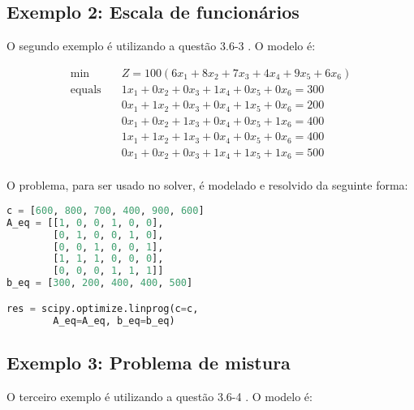 \documentclass[conference,compsoc]{IEEEtran}
\begin{document}
\subsection{Exemplo 2: Escala de funcionários} \label{sec_ex2}

O segundo exemplo é utilizando a questão 3.6-3 \cite{livro}. O modelo é:

\begin{equation}
\begin{aligned}
\min \quad & Z = 100(6x_1 + 8x_2 + 7x_3 + 4x_4 + 9x_5 + 6x_6)\\
\textrm{equals} \quad & 1x_1 + 0x_2 + 0x_3 + 1x_4 + 0x_5 + 0x_6 = 300\\
  &0x_1 + 1x_2 + 0x_3 + 0x_4 + 1x_5 + 0x_6 = 200\\
  &0x_1 + 0x_2 + 1x_3 + 0x_4 + 0x_5 + 1x_6 = 400\\
  &1x_1 + 1x_2 + 1x_3 + 0x_4 + 0x_5 + 0x_6 = 400\\
  &0x_1 + 0x_2 + 0x_3 + 1x_4 + 1x_5 + 1x_6 = 500\\
\end{aligned}
\end{equation}

O problema, para ser usado no solver, é modelado e resolvido da seguinte forma:

\begin{lstlisting}[language=Python]
c = [600, 800, 700, 400, 900, 600]
A_eq = [[1, 0, 0, 1, 0, 0],
        [0, 1, 0, 0, 1, 0],
        [0, 0, 1, 0, 0, 1],
        [1, 1, 1, 0, 0, 0],
        [0, 0, 0, 1, 1, 1]]
b_eq = [300, 200, 400, 400, 500]

res = scipy.optimize.linprog(c=c,
        A_eq=A_eq, b_eq=b_eq)
\end{lstlisting}

\subsection{Exemplo 3: Problema de mistura} \label{sec_ex3}

O terceiro exemplo é utilizando a questão 3.6-4 \cite{livro}. O modelo é:
\end{document}
